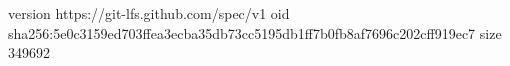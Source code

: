 version https://git-lfs.github.com/spec/v1
oid sha256:5e0c3159ed703ffea3ecba35db73cc5195db1ff7b0fb8af7696c202cff919ec7
size 349692
